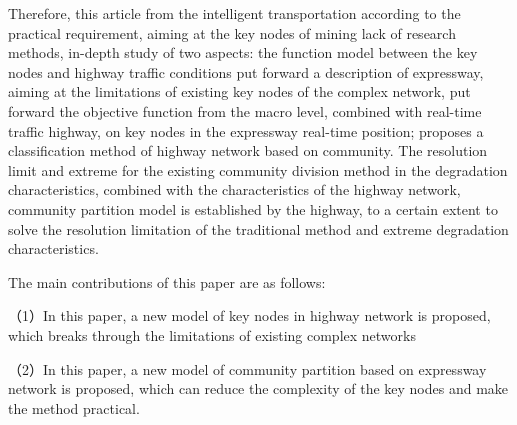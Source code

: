 \begin{eabstract}
	Therefore, this article from the intelligent transportation according to the practical requirement, aiming at the key nodes of mining lack of research methods, in-depth study of two aspects: the function model between the key nodes and highway traffic conditions put forward a description of expressway, aiming at the limitations of existing key nodes of the complex network, put forward the objective function from the macro level, combined with real-time traffic highway, on key nodes in the expressway real-time position; proposes a classification method of highway network based on community. The resolution limit and extreme for the existing community division method in the degradation characteristics, combined with the characteristics of the highway network, community partition model is established by the highway, to a certain extent to solve the resolution limitation of the traditional method and extreme degradation characteristics.
	
	The main contributions of this paper are as follows:
	
	（1）In this paper, a new model of key nodes in highway network is proposed, which breaks through the limitations of existing complex networks
	
 	（2）In this paper, a new model of community partition based on expressway network is proposed, which can reduce the complexity of the key nodes and make the method practical.
\end{eabstract}

